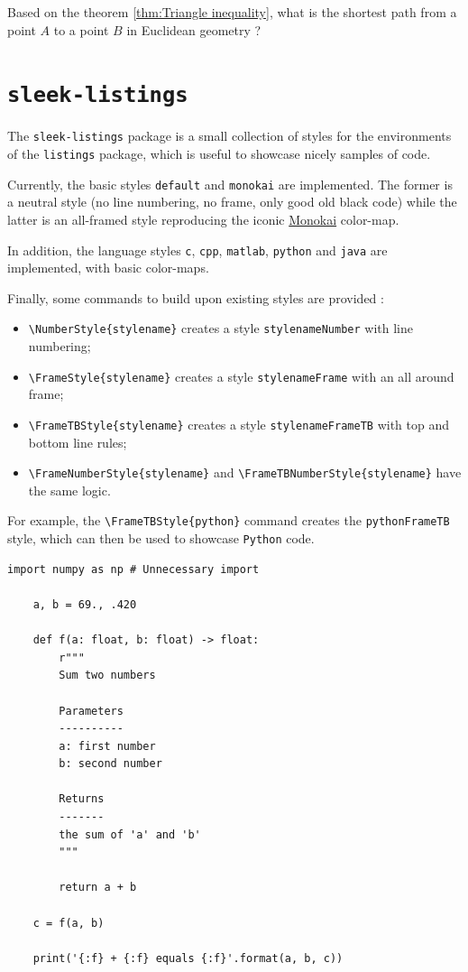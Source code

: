 \documentclass[12pt]{report}
\def\tbs{\textbackslash}
\begin{document}
    \begin{framedquest*}
        Based on the theorem \ref{thm:Triangle inequality}, what is the shortest path from a point $A$ to a point $B$ in Euclidean geometry ?
    \end{framedquest*}

    \newpage

    \section{\texttt{sleek-listings}}

    The \texttt{sleek-listings} package is a small collection of styles for the environments of the \texttt{listings} package, which is useful to showcase nicely samples of code.

    Currently, the basic styles \texttt{default} and \texttt{monokai} are implemented. The former is a neutral style (no line numbering, no frame, only good old black code) while the latter is an all-framed style reproducing the iconic \href{https://monokai.nl/}{Monokai} color-map.

    In addition, the language styles \texttt{c}, \texttt{cpp}, \texttt{matlab}, \texttt{python} and \texttt{java} are implemented, with basic color-maps.

    Finally, some commands to build upon existing styles are provided :

    \begin{itemize}
        \item \texttt{\tbs{}NumberStyle\{stylename\}} creates a style \texttt{stylenameNumber} with line numbering;
        \item \texttt{\tbs{}FrameStyle\{stylename\}} creates a style \texttt{stylenameFrame} with an all around frame;
        \item \texttt{\tbs{}FrameTBStyle\{stylename\}} creates a style \texttt{stylenameFrameTB} with top and bottom line rules;
        \item \texttt{\tbs{}FrameNumberStyle\{stylename\}} and \texttt{\tbs{}FrameTBNumberStyle\{stylename\}} have the same logic.
    \end{itemize}

    For example, the \texttt{\tbs{}FrameTBStyle\{python\}} command creates the \texttt{pythonFrameTB} style, which can then be used to showcase \texttt{Python} code.

    \begin{lstlisting}[style=pythonFrameTB, gobble=4]
    import numpy as np # Unnecessary import

    a, b = 69., .420

    def f(a: float, b: float) -> float:
        r"""
        Sum two numbers

        Parameters
        ----------
        a: first number
        b: second number

        Returns
        -------
        the sum of 'a' and 'b'
        """

        return a + b

    c = f(a, b)

    print('{:f} + {:f} equals {:f}'.format(a, b, c))
    \end{lstlisting}
\end{document}

